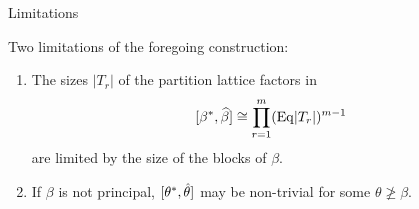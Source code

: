 
\begin{frame}[fragile,label=Limitations,shrink=5]{Limitations}

\vskip5mm

Two limitations of the foregoing construction:
\begin{enumerate}
\item The sizes $|T_r|$ of the partition lattice factors in 
\[
[\beta^*, \widehat{\beta}] \cong \prod_{r=1}^m (\mathrm{Eq} |T_r|)^{m-1}
\] 
are limited by the size of the blocks of $\beta$.

\vskip3mm

\item If $\beta$ is not principal, 
$[\theta^*, \hat{\theta}]$ may be non-trivial for some $\theta \ngeq \beta$.
\end{enumerate}
\end{frame}

